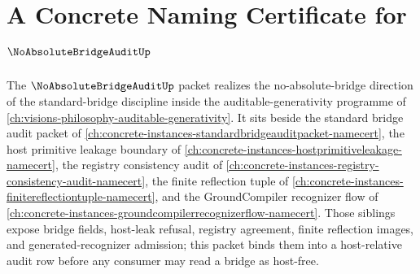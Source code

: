 \chapter{A Concrete Naming Certificate for $\NoAbsoluteBridgeAuditUp$}
\label{ch:concrete-instances-no-absolute-bridge-audit-namecert}

The $\NoAbsoluteBridgeAuditUp$ packet realizes the no-absolute-bridge direction of the standard-bridge discipline inside the auditable-generativity programme of \autoref{ch:visions-philosophy-auditable-generativity}. It sits beside the standard bridge audit packet of \autoref{ch:concrete-instances-standardbridgeauditpacket-namecert}, the host primitive leakage boundary of \autoref{ch:concrete-instances-hostprimitiveleakage-namecert}, the registry consistency audit of \autoref{ch:concrete-instances-registry-consistency-audit-namecert}, the finite reflection tuple of \autoref{ch:concrete-instances-finitereflectiontuple-namecert}, and the GroundCompiler recognizer flow of \autoref{ch:concrete-instances-groundcompilerrecognizerflow-namecert}. Those siblings expose bridge fields, host-leak refusal, registry agreement, finite reflection images, and generated-recognizer admission; this packet binds them into a host-relative audit row before any consumer may read a bridge as host-free.

